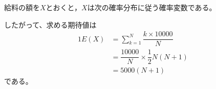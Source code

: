 \documentclass{article}
\begin{document}
給料の額を$X$とおくと，$X$は次の確率分布に従う確率変数である。

\begin{table}[hb]
    \centering
    \everymath{\displaystyle}
\end{table}

したがって、求める期待値は
\begin{alignat}{1}
    E(X) &= \sum_{k = 1}^{N} \dfrac{k \times 10000}{N} \\
         &= \dfrac{10000}{N} \times \dfrac{1}{2} N (N + 1) \\
         &= 5000 (N + 1)
\end{alignat}
である。
\end{document}
